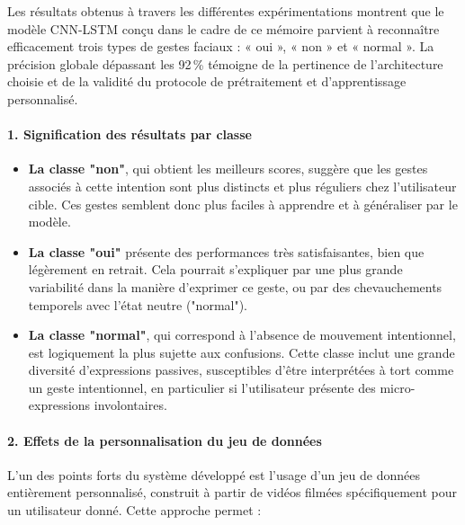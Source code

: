 \documentclass[
]{article}
\begin{document}
Les résultats obtenus à travers les différentes expérimentations montrent que le modèle CNN-LSTM conçu dans le cadre de ce mémoire parvient à reconnaître efficacement trois types de gestes faciaux : « oui », « non » et « normal ». La précision globale dépassant les 92\,\% témoigne de la pertinence de l'architecture choisie et de la validité du protocole de prétraitement et d'apprentissage personnalisé.

\hypertarget{signification-des-ruxe9sultats-par-classe}{%
\paragraph{\texorpdfstring{\textbf{1. Signification des résultats par classe}}{1. Signification des résultats par classe}}\label{signification-des-ruxe9sultats-par-classe}}

\begin{itemize}
\item
  \textbf{La classe "non"}, qui obtient les meilleurs scores, suggère que les gestes associés à cette intention sont plus distincts et plus réguliers chez l'utilisateur cible. Ces gestes semblent donc plus faciles à apprendre et à généraliser par le modèle.
\item
  \textbf{La classe "oui"} présente des performances très satisfaisantes, bien que légèrement en retrait. Cela pourrait s'expliquer par une plus grande variabilité dans la manière d'exprimer ce geste, ou par des chevauchements temporels avec l'état neutre ("normal").
\item
  \textbf{La classe "normal"}, qui correspond à l'absence de mouvement intentionnel, est logiquement la plus sujette aux confusions. Cette classe inclut une grande diversité d'expressions passives, susceptibles d'être interprétées à tort comme un geste intentionnel, en particulier si l'utilisateur présente des micro-expressions involontaires.
\end{itemize}

\hypertarget{effets-de-la-personnalisation-du-jeu-de-donnuxe9es}{%
\paragraph{\texorpdfstring{\textbf{2. Effets de la personnalisation du jeu de données}}{2. Effets de la personnalisation du jeu de données}}\label{effets-de-la-personnalisation-du-jeu-de-donnuxe9es}}

L'un des points forts du système développé est l'usage d'un jeu de données entièrement personnalisé, construit à partir de vidéos filmées spécifiquement pour un utilisateur donné. Cette approche permet :
\end{document}
